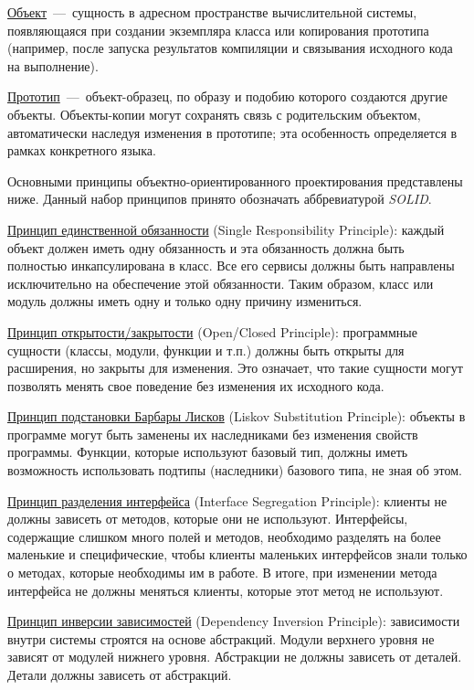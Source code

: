 \uline{Объект}~---~сущность в адресном пространстве вычислительной системы, появляющаяся при создании экземпляра класса или копирования прототипа (например, после запуска результатов компиляции и связывания исходного кода на выполнение).

\uline{Прототип}~---~объект-образец, по образу и подобию которого создаются другие объекты. Объекты-копии могут сохранять связь с родительским объектом, автоматически наследуя изменения в прототипе; эта особенность определяется в рамках конкретного языка.~\cite{PaisonOOP}

Основными принципы объектно-ориентированного проектирования представлены ниже. Данный набор принципов принято обозначать аббревиатурой \textit{SOLID}.

\uline{Принцип единственной обязанности} (Single Responsibility Principle): каждый объект должен иметь одну обязанность и эта обязанность должна быть полностью инкапсулирована в класс. Все его сервисы должны быть направлены исключительно на обеспечение этой обязанности. Таким образом, класс или модуль должны иметь одну и только одну причину измениться.

\uline{Принцип открытости/закрытости} (Open/Closed Principle): программные сущности (классы, модули, функции и т.п.) должны быть открыты для расширения, но закрыты для изменения. Это означает, что такие сущности могут позволять менять свое поведение без изменения их исходного кода.

\uline{Принцип подстановки Барбары Лисков} (Liskov Substitution Principle): объекты в программе могут быть заменены их наследниками без изменения свойств программы. Функции, которые используют базовый тип, должны иметь возможность использовать подтипы (наследники) базового типа, не зная об этом.

\uline{Принцип разделения интерфейса} (Interface Segregation Principle): клиенты не должны зависеть от методов, которые они не используют. Интерфейсы, содержащие слишком много полей и методов, необходимо разделять на более маленькие и специфические, чтобы клиенты маленьких интерфейсов знали только о методах, которые необходимы им в работе. В итоге, при изменении метода интерфейса не должны меняться клиенты, которые этот метод не используют.

\uline{Принцип инверсии зависимостей} (Dependency Inversion Principle): зависимости внутри системы строятся на основе абстракций. Модули верхнего уровня не зависят от модулей нижнего уровня. Абстракции не должны зависеть от деталей. Детали должны зависеть от абстракций.~\cite{RMartinAgile}

